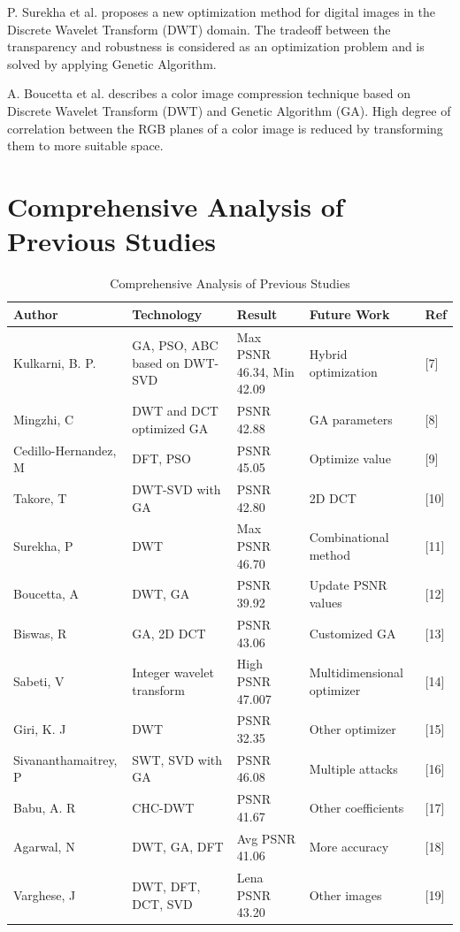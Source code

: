 P. Surekha et al. proposes a new optimization method for digital images in the Discrete Wavelet Transform (DWT) domain. The tradeoff between the transparency and robustness is considered as an optimization problem and is solved by applying Genetic Algorithm.

A. Boucetta et al. describes a color image compression technique based on Discrete Wavelet Transform (DWT) and Genetic Algorithm (GA). High degree of correlation between the RGB planes of a color image is reduced by transforming them to more suitable space.

\section{Comprehensive Analysis of Previous Studies}

\begin{table}[H]
\centering
\begin{tabular}{|p{2cm}|p{2.5cm}|p{2cm}|p{3cm}|p{2.5cm}|}
\hline
\textbf{Author} & \textbf{Technology} & \textbf{Result} & \textbf{Future Work} & \textbf{Ref} \\
\hline
Kulkarni, B. P. & GA, PSO, ABC based on DWT-SVD & Max PSNR 46.34, Min 42.09 & Hybrid optimization & [7] \\
\hline
Mingzhi, C & DWT and DCT optimized GA & PSNR 42.88 & GA parameters & [8] \\
\hline
Cedillo-Hernandez, M & DFT, PSO & PSNR 45.05 & Optimize value & [9] \\
\hline
Takore, T & DWT-SVD with GA & PSNR 42.80 & 2D DCT & [10] \\
\hline
Surekha, P & DWT & Max PSNR 46.70 & Combinational method & [11] \\
\hline
Boucetta, A & DWT, GA & PSNR 39.92 & Update PSNR values & [12] \\
\hline
Biswas, R & GA, 2D DCT & PSNR 43.06 & Customized GA & [13] \\
\hline
Sabeti, V & Integer wavelet transform & High PSNR 47.007 & Multidimensional optimizer & [14] \\
\hline
Giri, K. J & DWT & PSNR 32.35 & Other optimizer & [15] \\
\hline
Sivananthamaitrey, P & SWT, SVD with GA & PSNR 46.08 & Multiple attacks & [16] \\
\hline
Babu, A. R & CHC-DWT & PSNR 41.67 & Other coefficients & [17] \\
\hline
Agarwal, N & DWT, GA, DFT & Avg PSNR 41.06 & More accuracy & [18] \\
\hline
Varghese, J & DWT, DFT, DCT, SVD & Lena PSNR 43.20 & Other images & [19] \\
\hline
\end{tabular}
\caption{Comprehensive Analysis of Previous Studies}
\label{tab:related}
\end{table}

